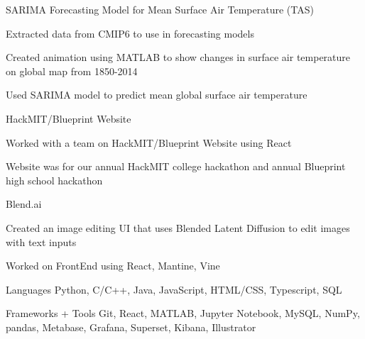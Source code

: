 \documentclass[12pt, letterpaper]{awesome-cv}
\begin{document}
\begin{cventries}
  \cventry
    {} %
    {SARIMA Forecasting Model for Mean Surface Air Temperature (TAS)} %
    {} %
    {} %
    {
      \vspace{-0.2in}
      \begin{cvitems} %
        \item {Extracted data from CMIP6 to use in forecasting models}
        \item {Created animation using MATLAB to show changes in surface air temperature on global map from 1850-2014}
        \item {Used SARIMA model to predict mean global surface air temperature}
      \end{cvitems}
    }

  \cventry
    {} %
    {HackMIT/Blueprint Website} %
    {} %
    {} %
    {
      \vspace{-0.25in}
      \begin{cvitems} %
        \item {Worked with a team on HackMIT/Blueprint Website using React}
        \item {Website was for our annual HackMIT college hackathon and annual Blueprint high school hackathon}
      \end{cvitems}
    }

  \cventry
    {} %
    {Blend.ai} %
    {} %
    {} %
    {
      \vspace{-0.25in}
      \begin{cvitems} %
        \item {Created an image editing UI that uses Blended Latent Diffusion to edit images with text inputs}
        \item {Worked on FrontEnd using React, Mantine, Vine}
      \end{cvitems}
    }
\end{cventries}

\begin{cvskills}
  \cvskill
    {Languages} %
    {Python, C/C++, Java, JavaScript, HTML/CSS, Typescript, SQL} %

  \cvskill
    {Frameworks + Tools} %
    {Git, React, MATLAB, Jupyter Notebook, MySQL, NumPy, pandas, Metabase, Grafana, Superset, Kibana, Illustrator} %
  
    
\end{cvskills}

\end{document}
